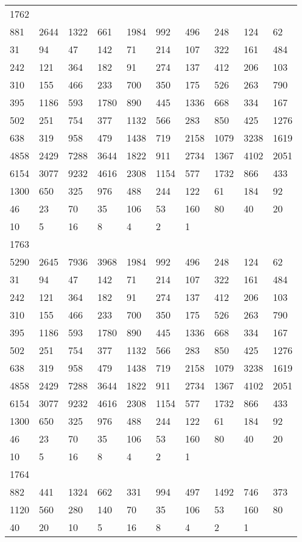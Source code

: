 \begin{longtable}{*{10}{l}}
1762&&&&&&&&&\\
881& 2644& 1322& 661& 1984& 992& 496& 248& 124& 62\\
31& 94& 47& 142& 71& 214& 107& 322& 161& 484\\
242& 121& 364& 182& 91& 274& 137& 412& 206& 103\\
310& 155& 466& 233& 700& 350& 175& 526& 263& 790\\
395& 1186& 593& 1780& 890& 445& 1336& 668& 334& 167\\
502& 251& 754& 377& 1132& 566& 283& 850& 425& 1276\\
638& 319& 958& 479& 1438& 719& 2158& 1079& 3238& 1619\\
4858& 2429& 7288& 3644& 1822& 911& 2734& 1367& 4102& 2051\\
6154& 3077& 9232& 4616& 2308& 1154& 577& 1732& 866& 433\\
1300& 650& 325& 976& 488& 244& 122& 61& 184& 92\\
46& 23& 70& 35& 106& 53& 160& 80& 40& 20\\
10& 5& 16& 8& 4& 2& 1& \\

1763&&&&&&&&&\\
5290& 2645& 7936& 3968& 1984& 992& 496& 248& 124& 62\\
31& 94& 47& 142& 71& 214& 107& 322& 161& 484\\
242& 121& 364& 182& 91& 274& 137& 412& 206& 103\\
310& 155& 466& 233& 700& 350& 175& 526& 263& 790\\
395& 1186& 593& 1780& 890& 445& 1336& 668& 334& 167\\
502& 251& 754& 377& 1132& 566& 283& 850& 425& 1276\\
638& 319& 958& 479& 1438& 719& 2158& 1079& 3238& 1619\\
4858& 2429& 7288& 3644& 1822& 911& 2734& 1367& 4102& 2051\\
6154& 3077& 9232& 4616& 2308& 1154& 577& 1732& 866& 433\\
1300& 650& 325& 976& 488& 244& 122& 61& 184& 92\\
46& 23& 70& 35& 106& 53& 160& 80& 40& 20\\
10& 5& 16& 8& 4& 2& 1& \\

1764&&&&&&&&&\\
882& 441& 1324& 662& 331& 994& 497& 1492& 746& 373\\
1120& 560& 280& 140& 70& 35& 106& 53& 160& 80\\
40& 20& 10& 5& 16& 8& 4& 2& 1& \\


\end{longtable}
